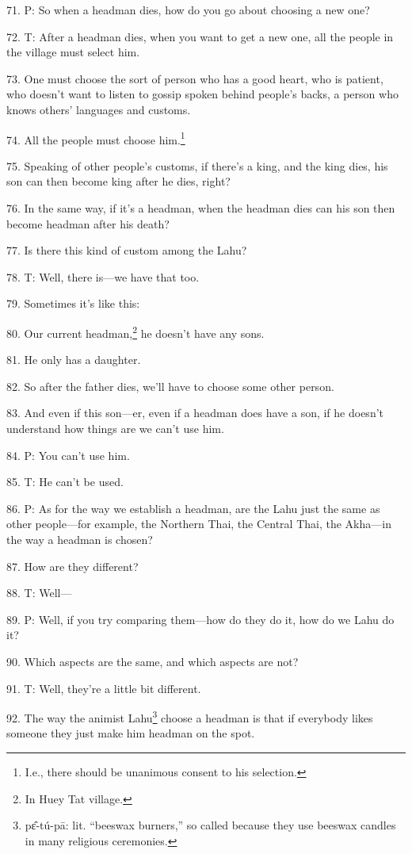 71. P: So when a headman dies, how do you go about choosing a new one?

72. T: After a headman dies, when you want to get a new one, all the people in
the village must select him.

73. One must choose the sort of person who has a good heart, who is patient, who
doesn't want to listen to gossip spoken behind people's backs, a person who knows
others' languages and customs.

74. All the people must choose him.\footnote{I.e., there should be unanimous consent to his selection.}

75. Speaking of other people's customs, if there's a king, and the king dies, his
son can then become king after he dies, right?

76. In the same way, if it's a headman, when the headman dies can his son then
become headman after his death?

77. Is there this kind of custom among the Lahu?

78. T: Well, there is---we have that too.

79. Sometimes it's like this:

80. Our current headman,\footnote{In Huey Tat village.} he doesn't have any sons.

81. He only has a daughter.

82. So after the father dies, we'll have to choose some other person.

83. And even if this son---er, even if a headman does have a son, if he doesn't
understand how things are we can't use him.

84. P: You can't use him.

85. T: He can't be used.

86. P: As for the way we establish a headman, are the Lahu just the same as other
people---for example, the Northern Thai, the Central Thai, the Akha---in the way
a headman is chosen?

87. How are they different?

88. T: Well---

89. P: Well, if you try comparing them---how do they do it, how do we Lahu do it?

90. Which aspects are the same, and which aspects are not?

91. T: Well, they're a little bit different.

92. The way the animist Lahu\footnote{pɛ̂-tú-pā: lit. ``beeswax burners,'' so called because they use beeswax candles in many religious ceremonies.} choose a headman is that if everybody likes someone
they just make him headman on the spot.

